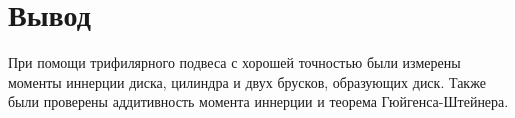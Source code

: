 \section{Вывод}
При помощи трифилярного подвеса с хорошей точностью были измерены моменты иннерции
диска, цилиндра и двух брусков, образующих диск. Также были проверены аддитивность
момента иннерции и теорема Гюйгенса-Штейнера.
